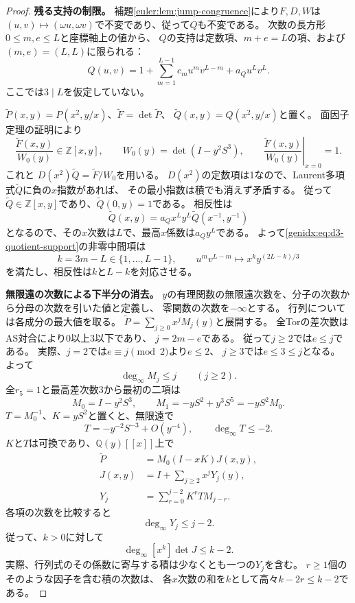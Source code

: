 \documentclass[11pt,a4paper]{ltjsarticle}
\theoremstyle{definition}
\begin{document}
\begin{proof}
\par\smallskip\noindent\textbf{残る支持の制限。}\quad
補題\ref{euler:lem:jump-congruence}により$F,D,W$は
$(u,v)\mapsto(\omega u,\omega v)$で不変であり、従って$Q$も不変である。
次数の長方形$0\le m,e\le L$と座標軸上の値から、
$Q$の支持は定数項、$m+e=L$の項、および$(m,e)=(L,L)$に限られる：
\begin{equation}\label{genidx:eq:d3-quotient-support}
 Q(u,v)=1+\sum_{m=1}^{L-1}c_m u^mv^{L-m}+a_Qu^Lv^L.
\end{equation}
ここでは$3\mid L$を仮定していない。

$\widetilde P(x,y)=P(x^2,y/x)$、$\widetilde F=\det\widetilde P$、
$\widetilde Q(x,y)=Q(x^2,y/x)$と置く。
面因子定理の証明により
\[
 \frac{\widetilde F(x,y)}{W_0(y)}\in\mathbb Z[x,y],
 \qquad
 W_0(y)=\det(I-y^2S^3),
 \qquad
 \left.\frac{\widetilde F(x,y)}{W_0(y)}\right|_{x=0}=1.
\]
これと
$D(x^2)\widetilde Q=\widetilde F/W_0$を用いる。
$D(x^2)$の定数項は1なので、Laurent多項式$\widetilde Q$に負の$x$指数があれば、
その最小指数は積でも消えず矛盾する。
従って$\widetilde Q\in\mathbb Z[x,y]$であり、$\widetilde Q(0,y)=1$である。
相反性は
\[
 \widetilde Q(x,y)=a_Qx^Ly^L\widetilde Q(x^{-1},y^{-1})
\]
となるので、その$x$次数は$L$で、最高$x$係数は$a_Qy^L$である。
よって\eqref{genidx:eq:d3-quotient-support}の非零中間項は
\[
 k=3m-L\in\{1,\ldots,L-1\},\qquad
 u^mv^{L-m}\longmapsto x^ky^{(2L-k)/3}
\]
を満たし、相反性は$k$と$L-k$を対応させる。

\par\smallskip\noindent\textbf{無限遠の次数による下半分の消去。}\quad
$y$の有理関数の無限遠次数を、分子の次数から分母の次数を引いた値と定義し、
零関数の次数を$-\infty$とする。
行列については各成分の最大値を取る。
$\widetilde P=\sum_{j\ge0}x^jM_j(y)$と展開する。
全Torの差次数はAS対合により0以上3以下であり、
$j=2m-e$である。
従って$j\ge2$では$e\le j$である。
実際、$j=2$では$e\equiv j\pmod2$より$e\le2$、
$j\ge3$では$e\le3\le j$となる。
よって
\[
 \deg_\infty M_j\le j\qquad(j\ge2).
\]
全$r_5=1$と最高差次数3から最初の二項は
\[
 M_0=I-y^2S^3,\qquad
 M_1=-yS^2+y^3S^5=-yS^2M_0.
\]
$T=M_0^{-1}$、$K=yS^2$と置くと、無限遠で
\[
 T=-y^{-2}S^{-3}+O(y^{-4}),\qquad \deg_\infty T\le-2.
\]
$K$と$T$は可換であり、$\mathbb Q(y)[[x]]$上で
\begin{align*}
 \widetilde P
 &=M_0(I-xK)J(x,y),\\
 J(x,y)&=I+\sum_{j\ge2}x^jY_j(y),\\
 Y_j&=\sum_{r=0}^{j-2}K^rT M_{j-r}.
\end{align*}
各項の次数を比較すると
\[
 \deg_\infty Y_j\le j-2.
\]
従って、$k>0$に対して
\begin{equation}\label{genidx:eq:d3-det-remainder-infinity}
 \deg_\infty [x^k]\det J\le k-2.
\end{equation}
実際、行列式のその係数に寄与する積は少なくとも一つの$Y_j$を含む。
$r\ge1$個のそのような因子を含む積の次数は、
各$x$次数の和を$k$として高々$k-2r\le k-2$である。


\end{proof}
\end{document}
